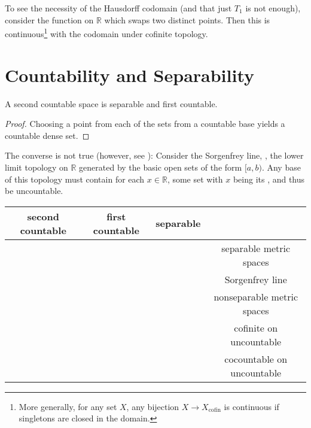 	\begin{rmk}
		To see the necessity of the Hausdorff codomain (and that just $T_1$ is not enough), consider the function on $\mathbb R$ which swaps two distinct points. Then this is continuous\footnote{
			More generally, for any set $X$, any bijection $X\to X_\text{cofin}$ is continuous if singletons are closed in the domain.
		} with the codomain under cofinite topology.
	\end{rmk}

	



\section{Countability and Separability}

	\begin{lem}
		A second countable space is separable and first countable.
	\end{lem}
	
	\begin{proof}
		Choosing a point from each of the sets from a countable base yields a countable dense set.
	\end{proof}
	
	\begin{rmk}
		The converse is not true (however, see ): Consider the Sorgenfrey line, \ie, the lower limit topology on $\mathbb R$ generated by the basic open sets of the form $[a, b)$. Any base of this topology must contain for each $x\in\mathbb R$, some set with $x$ being its \lub, and thus be uncountable.
	\end{rmk}
	
	\begin{center}
		\begin{tabular}{c|c|c|c}
			second countable & first countable & separable & \\
			\hline
			\mycheck & & & separable metric spaces\\
			\mycross & \mycheck & \mycheck & Sorgenfrey line\\
			\mycross & \mycheck & \mycross & nonseparable metric spaces\footnotemark\\
			& \mycross & \mycheck & cofinite on uncountable\\
			& \mycross & \mycross & cocountable on uncountable
		\end{tabular}
	\end{center}
	

